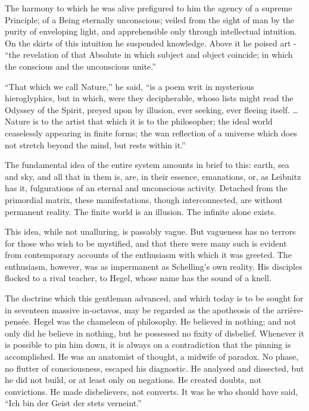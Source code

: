 \documentclass[]{book}
\begin{document}
The harmony to which he was alive prefigured to him the agency of a
supreme Principle; of a Being eternally unconscious; veiled from the
sight of man by the purity of enveloping light, and apprehensible only
through intellectual intuition. On the skirts of this intuition he
suspended knowledge. Above it he poised art - ``the revelation of that
Absolute in which subject and object coincide; in which the conscious
and the unconscious unite.''

``That which we call Nature,'' he said, ``is a poem writ in mysterious
hieroglyphics, but in which, were they decipherable, whoso lists might
read the Odyssey of the Spirit, preyed upon by illusion, ever seeking,
ever fleeing itself. \ldots{} Nature is to the artist that which it is
to the philosopher; the ideal world ceaselessly appearing in finite
forms; the wan reflection of a universe which does not stretch beyond
the mind, but rests within it.''

The fundamental idea of the entire system amounts in brief to this:
earth, sea and sky, and all that in them is, are, in their essence,
emanations, or, as Leibnitz has it, fulgurations of an eternal and
unconscious activity. Detached from the primordial matrix, these
manifestations, though interconnected, are without permanent reality.
The finite world is an illusion. The infinite alone exists.

This idea, while not unalluring, is passably vague. But vagueness has no
terrors for those who wish to be mystified, and that there were many
such is evident from contemporary accounts of the enthusiasm with which
it was greeted. The enthusiasm, however, was as impermanent as
Schelling's own reality. His disciples flocked to a rival teacher, to
Hegel, whose name has the sound of a knell.

The doctrine which this gentleman advanced, and which today is to be
sought for in seventeen massive in-octavos, may be regarded as the
apotheosis of the arrière-pensée. Hegel was the chameleon of philosophy.
He believed in nothing; and not only did he believe in nothing, but he
possessed no fixity of disbelief. Whenever it is possible to pin him
down, it is always on a contradiction that the pinning is accomplished.
He was an anatomist of thought, a midwife of paradox. No phase, no
flutter of consciousness, escaped his diagnostic. He analysed and
dissected, but he did not build, or at least only on negations. He
created doubts, not convictions. He made disbelievers, not converts. It
was he who should have said, ``Ich bin der Geist der stets verneint.''
\end{document}
